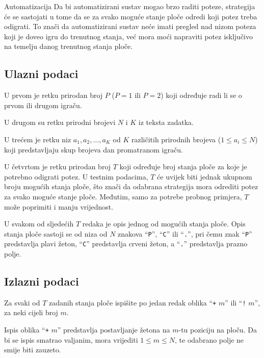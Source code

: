 \begin{statement}[
  problempoints=100,
  timelimit=1 sekunda,
  memorylimit=512 MiB,
]{Automatizacija}
Da bi automatizirani sustav mogao brzo raditi poteze,  
strategija će se sastojati u tome da se za svako moguće stanje 
ploče odredi koji potez treba odigrati. 
To znači da automatizirani sustav neće imati pregled nad nizom poteza
koji je doveo igru do trenutnog stanja, 
već mora moći napraviti potez isključivo na temelju danog trenutnog stanja ploče.  

\subsection*{Ulazni podaci}

U prvom je retku prirodan broj $P$ ($P=1$ ili $P=2$) koji određuje 
radi li se o prvom ili drugom igraču. 

U drugom su retku prirodni brojevi $N$ i $K$ iz teksta zadatka. 

U trećem je retku niz $a_1, a_2, \dots, a_K$ od $K$ različitih 
prirodnih brojeva ($1 \leq a_i \leq N$) 
koji predstavljaju skup brojeva dan promatranom igraču. 

U četvrtom je retku prirodan broj $T$ koji određuje broj stanja ploče za koje je 
potrebno odigrati potez. 
U testnim podacima, $T$ će uvijek biti jednak ukupnom broju mogućih stanja ploče, 
što znači da odabrana strategija mora odrediti potez za svako moguće stanje ploče. 
Međutim, samo za potrebe probnog primjera, $T$ može poprimiti i manju vrijednost. 

U svakom od sljedećih $T$ redaka je opis jednog od mogućih stanja ploče. 
Opis stanja ploče sastoji se od niza od $N$ znakova “\texttt{P}”, “\texttt{C}” ili “\texttt{.}”, 
pri čemu znak “\texttt{P}” predstavlja plavi žeton, “\texttt{C}” predstavlja crveni žeton, 
a “\texttt{.}” predstavlja prazno polje.  

\subsection*{Izlazni podaci}

Za svaki od $T$ zadanih stanja ploče ispišite 
po jedan redak oblika “\texttt{+} $m$” ili “\texttt{!} $m$”, za neki cijeli broj $m$. 

Ispis oblika “\texttt{+} $m$” predstavlja postavljanje žetona 
na $m$-tu poziciju na ploču. 
Da bi se ispis smatrao valjanim, mora vrijediti $1 \leq m \leq N$, 
te odabrano polje ne smije biti zauzeto. 


\end{statement}
